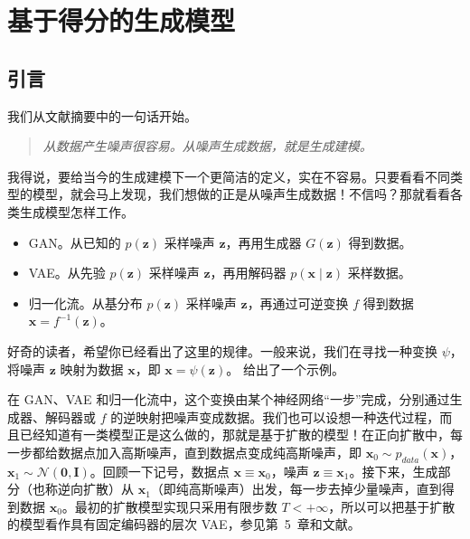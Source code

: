 \chapter{基于得分的生成模型}
\label{chap:09}

\section{引言}
\label{sec:09-01}

我们从文献摘要中的一句话开始。
\begin{quote}
  \emph{从数据产生噪声很容易。从噪声生成数据，就是生成建模。}
\end{quote}

我得说，要给当今的生成建模下一个更简洁的定义，实在不容易。只要看看不同类型的模型，就会马上发现，我们想做的正是从噪声生成数据！不信吗？那就看看各类生成模型怎样工作。
\begin{itemize}
  \item GAN。从已知的 $p(\mathbf z)$ 采样噪声 $\mathbf z$，再用生成器 $G(\mathbf z)$ 得到数据。
  \item VAE。从先验 $p(\mathbf z)$ 采样噪声 $\mathbf z$，再用解码器 $p(\mathbf x\mid\mathbf z)$ 采样数据。
  \item 归一化流。从基分布 $p(\mathbf z)$ 采样噪声 $\mathbf z$，再通过可逆变换 $f$ 得到数据 $\mathbf x=f^{-1}(\mathbf z)$。
\end{itemize}

好奇的读者，希望你已经看出了这里的规律。一般来说，我们在寻找一种变换 $\psi$，将噪声 $\mathbf z$ 映射为数据 $\mathbf x$，即 $\mathbf x=\psi(\mathbf z)$。 给出了一个示例。


在 GAN、VAE 和归一化流中，这个变换由某个神经网络“一步”完成，分别通过生成器、解码器或 $f$ 的逆映射把噪声变成数据。我们也可以设想一种迭代过程，而且已经知道有一类模型正是这么做的，那就是基于扩散的模型！在正向扩散中，每一步都给数据点加入高斯噪声，直到数据点变成纯高斯噪声，即 $\mathbf x_0\sim p_{\mathit{data}}(\mathbf x)$，$\mathbf x_1\sim\mathcal N(\mathbf 0,\mathbf I)$。回顾一下记号，数据点 $\mathbf x\equiv\mathbf x_0$，噪声 $\mathbf z\equiv\mathbf x_1$。接下来，生成部分（也称逆向扩散）从 $\mathbf x_1$（即纯高斯噪声）出发，每一步去掉少量噪声，直到得到数据 $\mathbf x_0$。最初的扩散模型实现只采用有限步数 $T<+\infty$，所以可以把基于扩散的模型看作具有固定编码器的层次 VAE，参见第~5~章和文献。

